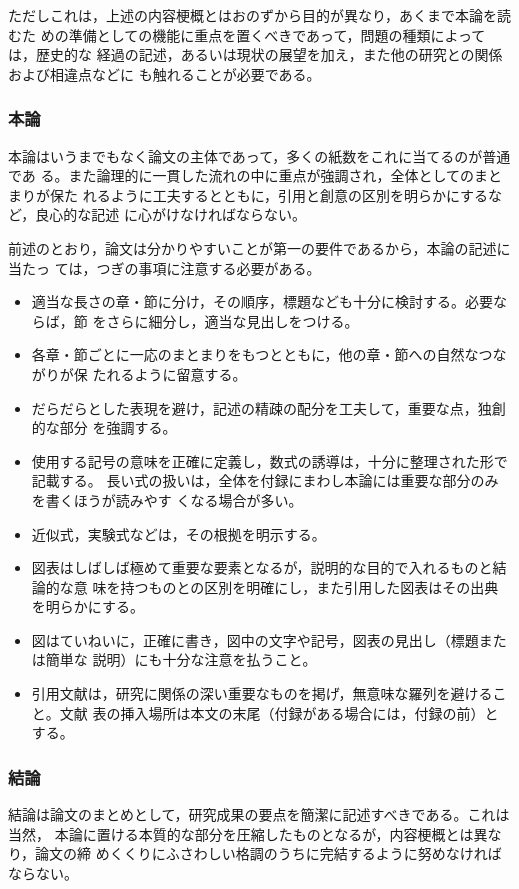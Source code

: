 \documentclass{kuisthesis}			%
\begin{document}
ただしこれは，上述の内容梗概とはおのずから目的が異なり，あくまで本論を読むた
めの準備としての機能に重点を置くべきであって，問題の種類によっては，歴史的な
経過の記述，あるいは現状の展望を加え，また他の研究との関係および相違点などに
も触れることが必要である。

\subsubsection{本論}\label{subsubsec-main}
本論はいうまでもなく論文の主体であって，多くの紙数をこれに当てるのが普通であ
る。また論理的に一貫した流れの中に重点が強調され，全体としてのまとまりが保た
れるように工夫するとともに，引用と創意の区別を明らかにするなど，良心的な記述
に心がけなければならない。

前述のとおり，論文は分かりやすいことが第一の要件であるから，本論の記述に当たっ
ては，つぎの事項に注意する必要がある。
\begin{itemize}%
\item
適当な長さの章・節に分け，その順序，標題なども十分に検討する。必要ならば，節
をさらに細分し，適当な見出しをつける。
\item
各章・節ごとに一応のまとまりをもつとともに，他の章・節への自然なつながりが保
たれるように留意する。
\item
だらだらとした表現を避け，記述の精疎の配分を工夫して，重要な点，独創的な部分
を強調する。
\item
使用する記号の意味を正確に定義し，数式の誘導は，十分に整理された形で記載する。
長い式の扱いは，全体を付録にまわし本論には重要な部分のみを書くほうが読みやす
くなる場合が多い。
\item
近似式，実験式などは，その根拠を明示する。
\item
図表はしばしば極めて重要な要素となるが，説明的な目的で入れるものと結論的な意
味を持つものとの区別を明確にし，また引用した図表はその出典を明らかにする。
\item
図はていねいに，正確に書き，図中の文字や記号，図表の見出し（標題または簡単な
説明）にも十分な注意を払うこと。
\item
引用文献は，研究に関係の深い重要なものを掲げ，無意味な羅列を避けること。文献
表の挿入場所は本文の末尾（付録がある場合には，付録の前）とする。
\end{itemize}%

\subsubsection{結論}\label{subsubsec-conclusion}
結論は論文のまとめとして，研究成果の要点を簡潔に記述すべきである。これは当然，
本論に置ける本質的な部分を圧縮したものとなるが，内容梗概とは異なり，論文の締
めくくりにふさわしい格調のうちに完結するように努めなければならない。
\end{document}
